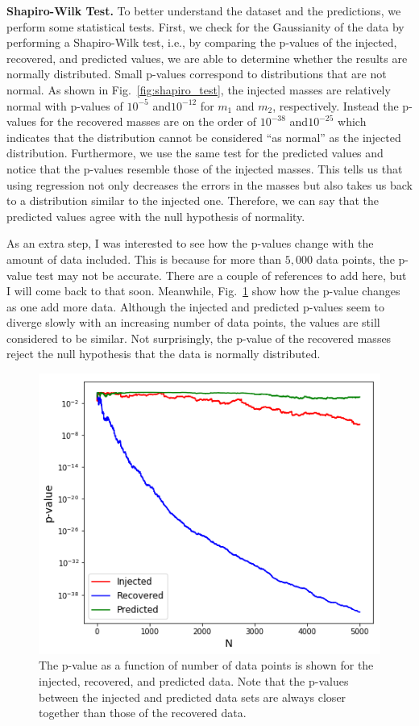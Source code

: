 \documentclass[aps,prd,twocolumn,superscriptaddress,preprintnumbers,floatfix,nofootinbib]{revtex4-2}
\begin{document}
\textbf{Shapiro-Wilk Test.} To better understand the dataset and the predictions, we perform some 
statistical tests. First, we check for the Gaussianity of the data by performing a Shapiro-Wilk 
test, i.e., by comparing the p-values of the injected, recovered, and predicted values, we are 
able to determine whether the results are normally distributed. Small p-values correspond to 
distributions that are not normal.  As shown in Fig.~\ref{fig:shapiro_test}, the injected 
masses are relatively normal with p-values of $10^{-5}$ and$10^{-12}$ for $m_1$ and 
$m_2$, respectively. Instead the p-values for the recovered masses are on the order of 
$10^{-38}$ and$10^{-25}$ which indicates that the distribution cannot be considered 
``as normal'' as the injected distribution. Furthermore, we use the same test for the predicted 
values and notice that the p-values resemble those of the injected masses. This tells us 
that using regression not only decreases the errors in the masses but also takes us back 
to a distribution similar to the injected one. Therefore, we can say that the predicted values 
agree with the null hypothesis of normality. 

As an extra step, I was interested to see how the p-values change with the amount of data 
included. This is because for more than $5,000$ data points, the p-value test may not be 
accurate. There are a couple of references to add here, but I will come back to that soon. 
Meanwhile, Fig.~\ref{fig:sw_test} show how the p-value changes as one add more data. 
Although the injected and predicted p-values seem to diverge slowly with an increasing 
number of data points, the values are still considered to be similar. Not surprisingly, the 
p-value of the recovered masses reject the null hypothesis that the data is normally 
distributed.
\begin{figure}[h]
  \centering
  \includegraphics[width=\linewidth]{SW_test}
  \caption{The p-value as a function of number of data points is shown for the injected, 
  		recovered, and predicted data. Note that the p-values between the injected and 
		predicted data sets are always closer together than those of the recovered data.}
  \label{fig:sw_test}
\end{figure}
\end{document}
